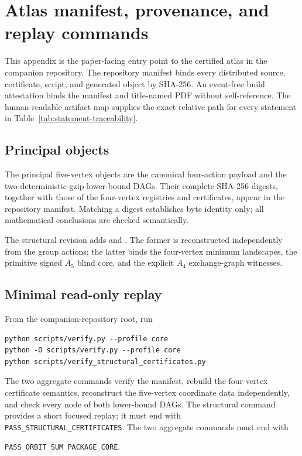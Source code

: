 \section{Atlas manifest, provenance, and replay commands}
\label{app:atlas-replay}

This appendix is the paper-facing entry point to the certified atlas in the
companion repository.  The repository manifest binds every distributed source,
certificate, script, and generated object by SHA-256.  An event-free build
attestation binds the manifest and title-named PDF without self-reference.
The human-readable artifact map supplies the exact relative
path for every statement in Table~\ref{tab:statement-traceability}.

\subsection{Principal objects}

The principal five-vertex objects are the canonical four-action payload and
the two deterministic-gzip lower-bound DAGs.  Their complete SHA-256 digests,
together with those of the four-vertex registries and certificates, appear in
the repository manifest.  Matching a digest establishes byte identity only;
all mathematical conclusions are checked semantically.

The structural revision adds
 and
.  The former is
reconstructed independently from the group actions; the latter binds the
four-vertex minimum landscapes, the primitive signed $A_5$ blind core, and
the explicit $A_4$ exchange-graph witnesses.

\subsection{Minimal read-only replay}

From the companion-repository root, run
\begin{verbatim}
python scripts/verify.py --profile core
python -O scripts/verify.py --profile core
python scripts/verify_structural_certificates.py
\end{verbatim}
The two aggregate commands verify the manifest, rebuild the four-vertex certificate
semantics, reconstruct the five-vertex coordinate data independently, and
check every node of both lower-bound DAGs.  The structural command provides a
short focused replay; it must end with
\texttt{PASS\_STRUCTURAL\_CERTIFICATES}.  The two aggregate commands must end with
\begin{center}\small
\texttt{PASS\_ORBIT\_SUM\_PACKAGE\_CORE}.
\end{center}

